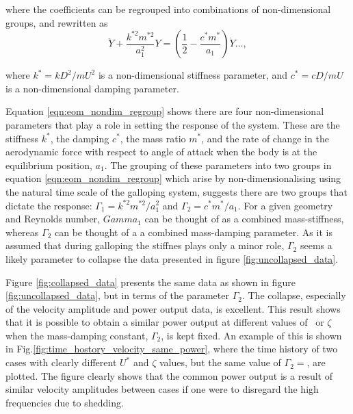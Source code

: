 where the coefficients can be regrouped into combinations of non-dimensional groups, and rewritten as
\begin{equation}
  \label{eqn:eom_nondim_regroup}
  \ddot{Y} + \frac{k^{*2}m^{*2}}{a_1^2}Y = \left(\frac{1}{2} - \frac{c^*m^*}{a_1}\right)\dot{Y} \dots,
\end{equation}

where $k^*=kD^2/mU^2$ is a non-dimensional stiffness parameter, and $c^*=cD/mU$ is a non-dimensional damping parameter.

Equation \ref{eqn:eom_nondim_regroup} shows there are four non-dimensional parameters that play a role in setting the response of the system. These are the stiffness $k^*$, the damping $c^*$, the mass ratio $m^*$, and the rate of change in the aerodynamic force with respect to angle of attack when the body is at the equilibrium position, $a_1$. The grouping of these parameters into two groups in equation \ref{eqn:eom_nondim_regroup} which arise by non-dimensionalising using the natural time scale of the galloping system, suggests there are two groups that dictate the response: $\Gamma_1 = k^{*2}m^{*2}/a_1^2$ and $\Gamma_2 = c^*m^*/a_1$. For a given geometry and Reynolds number, $Gamma_1$ can be thought of as a combined mass-stiffness, whereas $\Gamma_2$ can be thought of a a combined mass-damping parameter. As it is assumed that during galloping the stiffnes plays only a minor role, $\Gamma_2$ seems a likely parameter to collapse the data presented in figure \ref{fig:uncollapsed_data}.

Figure \ref{fig:collapsed_data} presents the same data as shown in figure \ref{fig:uncollapsed_data}, but in terms of the parameter $\Gamma_2$. The collapse, especially of the velocity amplitude and power output data, is excellent. This result shows that it is possible to obtain a similar power output at different values of \ustar\ or $\zeta$ when the mass-damping constant, $\Gamma_2$, is kept fixed. An example of this is shown in Fig.\ref{fig:time_hostory_velocity_same_power}, where the time history of two cases with clearly different $U^*$ and $\zeta$ values, but the same value of $\Gamma_2=$, are plotted. The figure clearly shows that the common power output is a result of similar velocity amplitudes between cases if one were to disregard the high frequencies due to shedding. 


 
